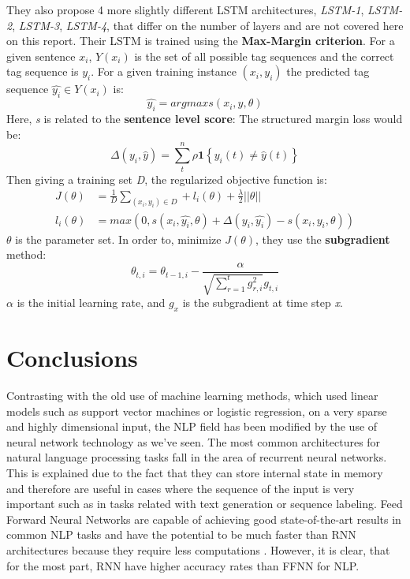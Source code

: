 \documentclass{scrartcl}
\begin{document}
    They also propose 4 more slightly different LSTM architectures, \textit{LSTM-1},
    \textit{LSTM-2}, \textit{LSTM-3}, \textit{LSTM-4}, that differ on the number of layers
    and are not covered here on this report.
    Their LSTM is trained using the \textbf{Max-Margin criterion}. For a given sentence $x_i$, 
    $Y(x_i)$ is the set of all possible tag sequences and the correct tag sequence is $y_i$.
    For a given training instance $(x_i, y_i)$ the predicted tag sequence $\hat{y_i} \in Y(x_i)$
    is:
    \begin{equation}
        \hat{y_i} = arg max s(x_i, y, \theta)
    \end{equation}
    Here, \textit{s} is related to the \textbf{sentence level score}:
    The structured margin loss would be:
    \begin{equation}
        \Delta(y_i, \hat{y}) = \sum_t^n \rho \textbf{1} \left\{ y_i(t) \neq \hat{y}(t) \right\}
    \end{equation}
    Then giving a training set \textit{D}, the regularized objective function is:
    \begin{align*}
        J(\theta) &= \frac{1}{\textit{D}} \sum_{(x_i,y_i) \in \textit{D}} + l_i(\theta) + \frac{\lambda}{2} \lvert \lvert \theta \rvert \rvert \\
        l_i(\theta) &= max(0, s(x_i, \hat{y_i}, \theta) + \Delta(y_i, \hat{y_i}) - s(x_i, y_i, \theta))
    \end{align*}
    $\theta$ is the parameter set.
    In order to, minimize $J(\theta)$, they use the \textbf{subgradient} method:
    \begin{equation}
        \theta_{t,i} = \theta_{t-1, i} - \frac{\alpha}{\sqrt{\sum^t_{r=1} g^2_{r,i}}g_{t,i}}
    \end{equation}
    $\alpha$ is the initial learning rate, and $g_x$ is the subgradient at time step \textit{x}.

    \newpage
    \section{Conclusions}
    Contrasting with the old use of machine learning methods, which used linear models such as 
    support vector machines or logistic regression, on a very sparse and highly dimensional 
    input, the NLP field has been modified by the use of neural network technology as we've seen.
    The most common architectures for natural language processing tasks fall in the area of 
    recurrent neural networks. This is explained due to the fact that they can store internal state
    in memory and therefore are useful in cases where the sequence of the input is very important
    such as in tasks related with text generation or sequence labeling.
    Feed Forward Neural Networks are capable of achieving good state-of-the-art results in common
    NLP tasks and have the potential to be much faster than RNN architectures because they require
    less computations \cite{botha-etal-2017-natural}. However, it is clear, that for the most part,
    RNN have higher accuracy rates than FFNN for NLP.
    \newpage
    \medskip
    
    
\end{document}

